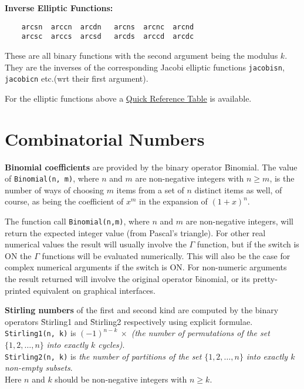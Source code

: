 \textbf{Inverse Elliptic Functions:}
\begin{verbatim}
    arcsn  arccn  arcdn   arcns  arcnc  arcnd
    arcsc  arccs  arcsd   arcds  arccd  arcdc
\end{verbatim}
These are all binary functions with the second argument being the modulus $k$.
They are the inverses of the corresponding Jacobi elliptic functions
\texttt{jacobisn}, \texttt{jacobicn} etc.\/(wrt their first argument).

For the elliptic functions above
a \hyperlink{ELLIPFNTAB}{Quick Reference Table} is available.

\section{Combinatorial Numbers}
  
\hypertarget{operator:BINOMIAL}{}
\textbf{Binomial coefficients} are provided by the binary operator \f{Binomial}.
The value of \texttt{Binomial(n, m)}, where $n$ and $m$ are non-negative
integers with $n \geq m$, is the number of ways of choosing $m$ items from a
set of $n$ distinct items as well, of course, as being the coefficient of $x^m$
in the expansion of $(1+x)^n$.

The function call \texttt{Binomial(n,m)}, where $n$ and $m$
are non-negative integers, will return the expected integer value
(from Pascal's triangle). For other real numerical values the result will
usually involve the $\Gamma$ function, but if the switch
 is ON the $\Gamma$ functions will be evaluated numerically.
This will also be the case for complex numerical arguments if the switch
 is ON.  For non-numeric arguments the result returned will
involve the original operator \f{binomial}, or its pretty-printed equivalent
on graphical interfaces.

\hypertarget{operator:Stirling1}{}\hypertarget{operator:Stirling2}{}
\textbf{Stirling numbers} of the first and second kind are computed
by the binary operators \f{Stirling1} and \f{Stirling2}
respectively using explicit formulae.
\texttt{Stirling1(n, k)} is $(-1)^{n-k}\ \times$
\emph{(the number of permutations of the set} $\{1, 2, \ldots, n\}$
\emph{into exactly $k$ cycles)}.\\
\texttt{Stirling2(n, k)} is \emph{the number of partitions of the set}
$\{1, 2, \ldots, n\}$ \emph{into exactly $k$ non-empty subsets}.\\
Here $n$ and $k$ should be non-negative integers with $n \geq k$.

